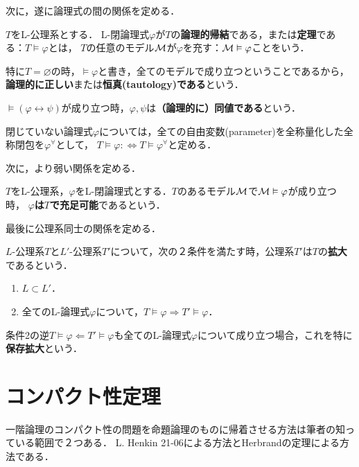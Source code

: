 \documentclass[uplatex, dvipdfmx]{jsreport}
\begin{document}
次に，遂に論理式の間の関係を定める．

\begin{definition}
    $T$をL-公理系とする．
    L-閉論理式$\varphi$が$T$の\textbf{論理的帰結}である，または\textbf{定理}である：$T\vDash\varphi$とは，
    $T$の任意のモデル$\mathcal{M}$が$\varphi$を充す：$\mathcal{M}\vDash\varphi$ことをいう．

    特に$T=\varnothing$の時，$\vDash\varphi$と書き，全てのモデルで成り立つということであるから，
    \textbf{論理的に正しい}または\textbf{恒真(tautology)である}という．
    
    $\vDash(\varphi\leftrightarrow\psi)$が成り立つ時，$\varphi,\psi$は\textbf{（論理的に）同値である}という．
\end{definition}
\begin{remark}
    閉じていない論理式$\varphi$については，全ての自由変数(parameter)を全称量化した全称閉包を$\varphi^\forall$として，
    $T\vDash\varphi:\Leftrightarrow T\vDash\varphi^\forall$と定める．
\end{remark}

次に，より弱い関係を定める．

\begin{definition}[satisfiability]
    $T$をL-公理系，$\varphi$をL-閉論理式とする．$T$のあるモデル$\mathcal{M}$で$\mathcal{M}\vDash\varphi$が成り立つ時，
    \textbf{$\varphi$は$T$で充足可能}であるという．
\end{definition}

最後に公理系同士の関係を定める．

\begin{definition}[extension]
    $L$-公理系$T$と$L'$-公理系$T'$について，次の２条件を満たす時，公理系$T'$は$T$の\textbf{拡大}であるという．
    \begin{enumerate}
        \item $L\subset L'$．
        \item 全てのL-論理式$\varphi$について，$T\vDash\varphi\Rightarrow T'\vDash\varphi$．
    \end{enumerate}
    条件2の逆$T\vDash\varphi\Leftarrow T'\vDash\varphi$も全てのL-論理式$\varphi$について成り立つ場合，これを特に\textbf{保存拡大}という．
\end{definition}

\section{コンパクト性定理}

一階論理のコンパクト性の問題を命題論理のものに帰着させる方法は筆者の知っている範囲で２つある．
L. Henkin 21-06による方法とHerbrandの定理による方法である．
\end{document}
